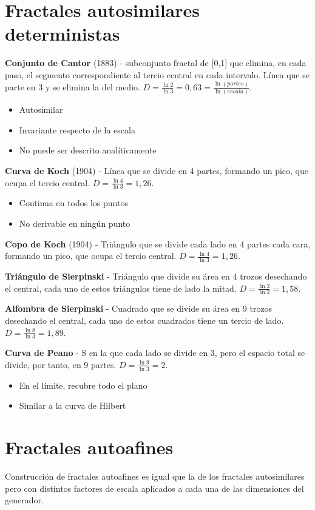 \section{Fractales autosimilares deterministas}
\textbf{Conjunto de Cantor} (1883) - subconjunto fractal de [0,1] que elimina, en cada paso, el segmento correspondiente al tercio central en cada intervalo. Línea que se parte en 3 y se elimina la del medio. $D=\frac{\ln 2}{\ln 3}= 0,63=\frac{\ln (partes)}{\ln (escala)}$.
\begin{itemize}
	\item Autosimilar
	\item Invariante respecto de la escala
	\item No puede ser descrito analíticamente
\end{itemize}

\textbf{Curva de Koch} (1904) - Línea que se divide en 4 partes, formando un pico, que ocupa el tercio central. $D=\frac{\ln 4}{\ln 3}=1,26$.
\begin{itemize}
	\item Continua en todos los puntos
	\item No derivable en ningún punto
\end{itemize}

\textbf{Copo de Koch} (1904) - Triángulo que se divide cada lado en 4 partes cada cara, formando un pico, que ocupa el tercio central. $D=\frac{\ln 4}{\ln 3}=1,26$.

\textbf{Triángulo de Sierpinski} - Triángulo que divide su área en 4 trozos desechando el central, cada uno de estos triángulos tiene de lado la mitad. $D=\frac{\ln 3}{\ln 2}=1,58$.

\textbf{Alfombra de Sierpinski} - Cuadrado que se divide su área en 9 trozos desechando el central, cada uno de estos cuadrados tiene un tercio de lado. $D=\frac{\ln 8}{\ln 3}=1,89$.

\textbf{Curva de Peano} - S en la que cada lado se divide en 3, pero el espacio total se divide, por tanto, en 9 partes. $D=\frac{\ln 9}{\ln 3}=2$.
\begin{itemize}
	\item En el límite, recubre todo el plano
	\item Similar a la curva de Hilbert
\end{itemize}

\section{Fractales autoafines}
Construcción de fractales autoafines es igual que la de los fractales autosimilares pero con distintos factores de escala aplicados a cada una de las dimensiones del generador.

